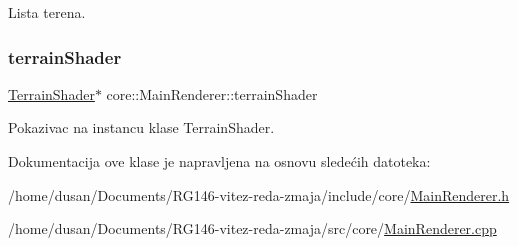 Lista terena. 

\mbox{\label{classcore_1_1MainRenderer_a502a7c6f714266f27601913496c396f3}} 
\subsubsection{\texorpdfstring{terrain\+Shader}{terrainShader}}
{\footnotesize\ttfamily \hyperlink{classshader_1_1TerrainShader}{Terrain\+Shader}$\ast$ core\+::\+Main\+Renderer\+::terrain\+Shader\hspace{0.3cm}{\ttfamily [private]}}



Pokazivac na instancu klase Terrain\+Shader. 



Dokumentacija ove klase je napravljena na osnovu sledećih datoteka\+:\begin{DoxyCompactItemize}
\item 
/home/dusan/\+Documents/\+R\+G146-\/vitez-\/reda-\/zmaja/include/core/\hyperlink{MainRenderer_8h}{Main\+Renderer.\+h}\item 
/home/dusan/\+Documents/\+R\+G146-\/vitez-\/reda-\/zmaja/src/core/\hyperlink{MainRenderer_8cpp}{Main\+Renderer.\+cpp}\end{DoxyCompactItemize}
